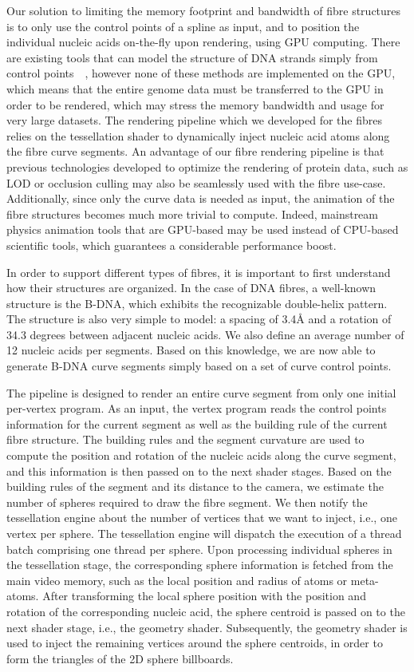 Our solution to limiting the memory footprint and bandwidth of fibre structures is to only use the control points of a spline as input, and to position the individual nucleic acids on-the-fly upon rendering, using GPU computing.
There are existing tools that can model the structure of DNA strands simply from control points~\cite{lu20083dna}~\cite{hornus2013easy}, however none of these methods are implemented on the GPU, which means that the entire genome data must be transferred to the GPU in order to be rendered, which may stress the memory bandwidth and usage for very large datasets.
The rendering pipeline which we developed for the fibres relies on the tessellation shader to dynamically inject nucleic acid atoms along the fibre curve segments.
An advantage of our fibre rendering pipeline is that previous technologies developed to optimize the rendering of protein data, such as LOD or occlusion culling may also be seamlessly used with the fibre use-case.
Additionally, since only the curve data is needed as input, the animation of the fibre structures becomes much more trivial to compute.
Indeed, mainstream physics animation tools that are GPU-based may be used instead of CPU-based scientific tools, which guarantees a considerable performance boost.

In order to support different types of fibres, it is important to first understand how their structures are organized.
In the case of DNA fibres, a well-known structure is the B-DNA, which exhibits the recognizable double-helix pattern.
The structure is also very simple to model: a spacing of 3.4Å and a rotation of 34.3 degrees between adjacent nucleic acids. 
We also define an average number of 12 nucleic acids per segments.
Based on this knowledge, we are now able to generate B-DNA curve segments simply based on a set of curve control points.

The pipeline is designed to render an entire curve segment from only one initial per-vertex program.
As an input, the vertex program reads the control points information for the current segment as well as the building rule of the current fibre structure.
The building rules and the segment curvature are used to compute the position and rotation of the nucleic acids along the curve segment, and this information is then passed on to the next shader stages.
Based on the building rules of the segment and its distance to the camera, we estimate the number of spheres required to draw the fibre segment.
We then notify the tessellation engine about the number of vertices that we want to inject, i.e., one vertex per sphere.
The tessellation engine will dispatch the execution of a thread batch comprising one thread per sphere.
Upon processing individual spheres in the tessellation stage, the corresponding sphere information is fetched from the main video memory, such as the local position and radius of atoms or meta-atoms.
After transforming the local sphere position with the position and rotation of the corresponding nucleic acid, the sphere centroid is passed on to the next shader stage, i.e., the geometry shader.
Subsequently, the geometry shader is used to inject the remaining vertices around the sphere centroids, in order to form the triangles of the 2D sphere billboards.

